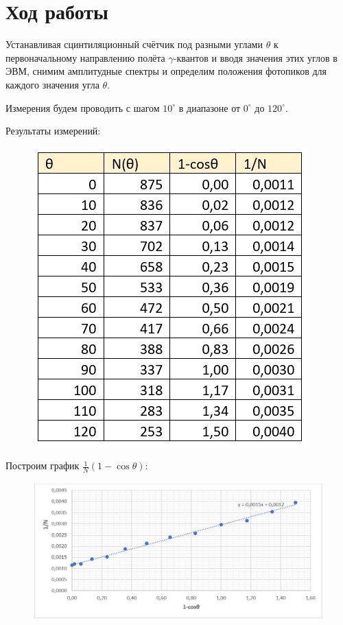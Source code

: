 \documentclass[a4paper,12pt]{article}
\begin{document}
	
\section{Ход работы}
Устанавливая сцинтиляционный счётчик под разными углами $\theta$ к первоначальному
направлению полёта $\gamma$-квантов и вводя значения этих углов в ЭВМ, снимим амплитудные
спектры и определим положения фотопиков для каждого значения угла $\theta$.

Измерения будем проводить с шагом $10^\circ$ в диапазоне от $0^\circ$ до $120^\circ$.

Результаты измерений:
\begin{figure}[h!]
    \begin{center}
		\centering
		\includegraphics[width=0.5\linewidth]{2020-10-22.jpg}
    \end{center}
\end{figure}

\pagebreak
Построим график $\frac{1}{N}(1-\cos\theta)$:
\begin{figure}[h!]
    \begin{center}
		\centering
		\includegraphics[width=1.1\linewidth]{2020-10-15.jpg}
    \end{center}
\end{figure}
\end{document}

